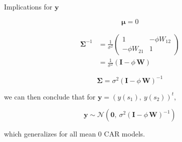 \documentclass[11pt,ignorenonframetext,]{beamer}
\begin{document}
\begin{frame}{Implications for \(\symbf{y}\)}
\protect\hypertarget{implications-for-symbfy}{}

\vspace{-3mm}

\[ \symbf{\mu} = 0 \]

\pause

\[
\begin{aligned}
\symbf{\Sigma}^{-1} &= \frac{1}{\sigma^2}
  \begin{pmatrix} 
    1 & -\phi W_{12} \\
    -\phi W_{21} & 1
  \end{pmatrix} \\
  &= \frac{1}{\sigma^2}(\symbf{I} - \phi \, \symbf{W})
\end{aligned}
\]

\pause

\[
\symbf{\Sigma} = \sigma^2(\symbf{I} - \phi \, \symbf{W})^{-1}
\]

\pause

we can then conclude that for \(\symbf{y} = (y(s_1),~y(s_2))^t\),

\[
\symbf{y} \sim \mathcal{N}\left(
\symbf{0}, ~
\sigma^2 (\symbf{I} - \phi \, \symbf{W})^{-1}
\right)
\]

which generalizes for all mean 0 CAR models.

\end{frame}
\end{document}
